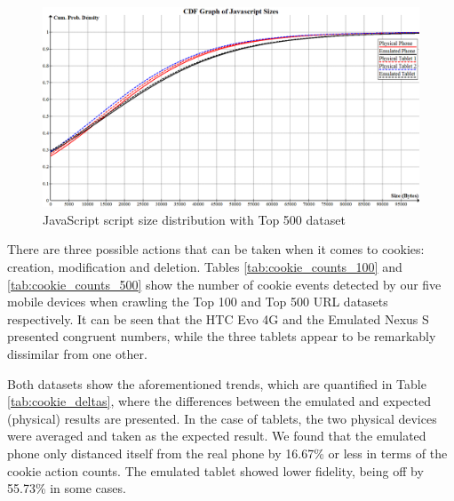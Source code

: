 \documentclass{acm_proc_article-sp}
\begin{document}
\begin{figure}[ht] 
\centering \includegraphics[scale=0.30]{diagrams/javascript_cdf.png}
\caption{JavaScript script size distribution with Top 500 dataset}
\label{fig:javascript_cdf}
\end{figure}

There are three possible actions that can be taken when it comes to cookies: creation, modification and deletion. Tables \ref{tab:cookie_counts_100} and \ref{tab:cookie_counts_500} show the number of cookie events detected by our five mobile devices when crawling the Top 100 and Top 500 URL datasets respectively. It can be seen that the HTC Evo 4G and the Emulated Nexus S presented congruent numbers, while the three tablets appear to be remarkably dissimilar from one other.

Both datasets show the aforementioned trends, which are quantified in Table \ref{tab:cookie_deltas}, where the differences between the emulated and expected (physical) results are presented. In the case of tablets, the two physical devices were averaged and taken as the expected result. We found that the emulated phone only distanced itself from the real phone by 16.67\% or less in terms of the cookie action counts. The emulated tablet showed lower fidelity, being off by 55.73\% in some cases.
\end{document}
